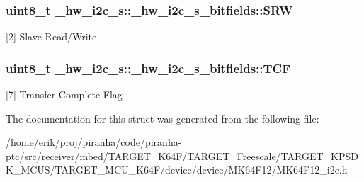 \subsubsection[{\texorpdfstring{S\+RW}{SRW}}]{\setlength{\rightskip}{0pt plus 5cm}uint8\+\_\+t \+\_\+hw\+\_\+i2c\+\_\+s\+::\+\_\+hw\+\_\+i2c\+\_\+s\+\_\+bitfields\+::\+S\+RW}\hypertarget{struct__hw__i2c__s_1_1__hw__i2c__s__bitfields_aa5f35708b5d39be16a6325922cf87003}{}\label{struct__hw__i2c__s_1_1__hw__i2c__s__bitfields_aa5f35708b5d39be16a6325922cf87003}
\mbox{[}2\mbox{]} Slave Read/\+Write 
\subsubsection[{\texorpdfstring{T\+CF}{TCF}}]{\setlength{\rightskip}{0pt plus 5cm}uint8\+\_\+t \+\_\+hw\+\_\+i2c\+\_\+s\+::\+\_\+hw\+\_\+i2c\+\_\+s\+\_\+bitfields\+::\+T\+CF}\hypertarget{struct__hw__i2c__s_1_1__hw__i2c__s__bitfields_ac88b5b400303c5625bd9cbe0c053d540}{}\label{struct__hw__i2c__s_1_1__hw__i2c__s__bitfields_ac88b5b400303c5625bd9cbe0c053d540}
\mbox{[}7\mbox{]} Transfer Complete Flag 

The documentation for this struct was generated from the following file\+:\begin{DoxyCompactItemize}
\item 
/home/erik/proj/piranha/code/piranha-\/ptc/src/receiver/mbed/\+T\+A\+R\+G\+E\+T\+\_\+\+K64\+F/\+T\+A\+R\+G\+E\+T\+\_\+\+Freescale/\+T\+A\+R\+G\+E\+T\+\_\+\+K\+P\+S\+D\+K\+\_\+\+M\+C\+U\+S/\+T\+A\+R\+G\+E\+T\+\_\+\+M\+C\+U\+\_\+\+K64\+F/device/device/\+M\+K64\+F12/M\+K64\+F12\+\_\+i2c.\+h\end{DoxyCompactItemize}
